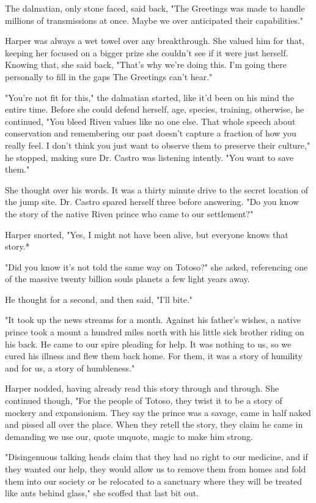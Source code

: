The dalmatian, only stone faced, said back, "The Greetings was made to handle millions of transmissions at once. Maybe we over anticipated their capabilities."

Harper was always a wet towel over any breakthrough. She valued him for that, keeping her focused on a bigger prize she couldn't see if it were just herself. Knowing that, she said back, "That's why we're doing this. I'm going there personally to fill in the gaps The Greetings can't hear."

"You're not fit for this," the dalmatian started, like it'd been on his mind the entire time. Before she could defend herself, age, species, training, otherwise, he continued, "You bleed Riven values like no one else. That whole speech about conservation and remembering our past doesn't capture a fraction of how you really feel. I don't think you just want to observe them to preserve their culture," he stopped, making sure Dr. Castro was listening intently. "You want to save them."

She thought over his words. It was a thirty minute drive to the secret location of the jump site. Dr. Castro spared herself three before answering. "Do you know the story of the native Riven prince who came to our settlement?"

Harper snorted, "Yes, I might not have been alive, but everyone knows that story.*

"Did you know it's not told the same way on Totoso?" she asked, referencing one of the massive twenty billion souls planets a few light years away.

He thought for a second, and then said, "I'll bite."

"It took up the news streams for a month. Against his father's wishes, a native prince took a mount a hundred miles north with his little sick brother riding on his back. He came to our spire pleading for help. It was nothing to us, so we cured his illness and flew them back home. For them, it was a story of humility and for us, a story of humbleness."

Harper nodded, having already read this story through and through. She continued though, "For the people of Totoso, they twist it to be a story of mockery and expansionism. They say the prince was a savage, came in half naked and pissed all over the place. When they retell the story, they claim he came in demanding we use our, quote unquote, magic to make him strong.

"Disingenuous talking heads claim that they had no right to our medicine, and if they wanted our help, they would allow us to remove them from homes and fold them into our society or be relocated to a sanctuary where they will be treated like ants behind glass," she scoffed that last bit out.


